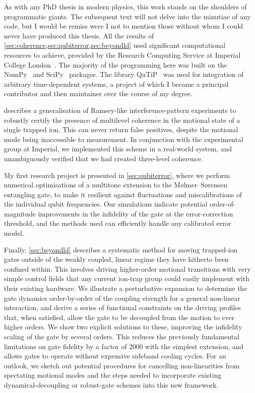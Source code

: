 As with any PhD thesis in modern physics, this work stands on the shoulders of programmatic giants.
The subsequent text will not delve into the minutiae of any code, but I would be remiss were I not to mention those without whom I could never have produced this thesis.
All the results of \cref{sec:coherence,sec:qubiterror,sec:beyondld} used significant computational resources to achieve, provided by the Research Computing Service at Imperial College London~\cite{ImperialHPC}.
The majority of the programming here was built on the NumPy~\cite{Harris2020} and SciPy~\cite{Virtanen2020} packages.
The library QuTiP~\cite{Johansson2013} was used for integration of arbitrary time-dependent systems, a project of which I became a principal contributor and then maintainer over the course of my degree.

 describes a generalisation of Ramsey-like interference-pattern experiments to robustly certify the presence of multilevel coherence in the motional state of a single trapped ion.
This can never return false positives, despite the motional mode being inaccessible to measurement.
In conjunction with the experimental group at Imperial, we implemented this scheme in a real-world system, and unambiguously verified that we had created three-level coherence.

My first research project is presented in \cref{sec:qubiterror}, where we perform numerical optimisations of a multitone extension to the M\o lmer--S\o rensen entangling gate, to make it resilient against fluctuations and miscalibrations of the individual qubit frequencies.
Our simulations indicate potential order-of-magnitude improvements in the infidelity of the gate at the error-correction threshold, and the methods used can efficiently handle any calibrated error model.

Finally, \cref{sec:beyondld} describes a systematic method for moving trapped-ion gates outside of the weakly coupled, linear regime they have hitherto been confined within.
This involves driving higher-order motional transitions with very simple control fields that any current ion-trap group could easily implement with their existing hardware.
We illustrate a perturbative expansion to determine the gate dynamics order-by-order of the coupling strength for a general non-linear interaction, and derive a series of functional constraints on the driving profiles that, when satisfied, allow the gate to be decoupled from the motion to ever higher orders.
We show two explicit solutions to these, improving the infidelity scaling of the gate by several orders. 
This reduces the previously fundamental limitations on gate fidelity by a factor of \num{2000} with the simplest extension, and allows gates to operate without expensive sideband cooling cycles.
For an outlook, we sketch out potential procedures for cancelling non-linearities from spectating motional modes and the steps needed to incorporate existing dynamical-decoupling or robust-gate schemes into this new framework.

